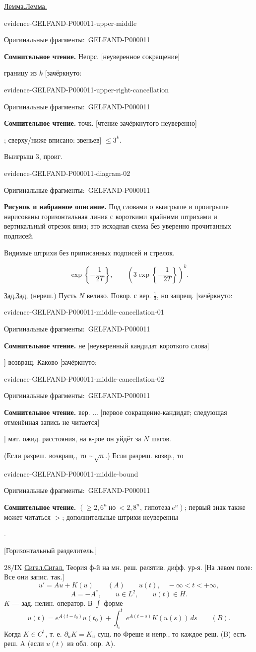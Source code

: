 \documentclass[11pt]{article}
\let\MathUnderline\underline
\renewcommand{\underline}[1]{\ifmmode\MathUnderline{#1}\else\uline{#1}\fi}
\newcommand{\EvidenceBlock}[4]{%
 \par\smallskip\noindent\begin{minipage}{\linewidth}
 \begin{minipage}[t]{.47\linewidth}\vspace{0pt}\centering
 \csname evidence-#1-#2\endcsname\par
 {\scriptsize\SourceCropCaption\ #1}\par
 \end{minipage}\hfill
 \begin{minipage}[t]{.49\linewidth}\vspace{0pt}\raggedright
 {\small\color{orange!65!black}\textbf{#4} #3}\par
 \end{minipage}
 \end{minipage}\par\smallskip}
\newcommand{\Unclear}[3]{\EvidenceBlock{#1}{#2}{#3}{\ReadingCaption}}
\newcommand{\SourceFigure}[3]{\EvidenceBlock{#1}{#2}{#3}{\DiagramCaption}}
\newcommand{\SourceCropCaption}{Оригинальные фрагменты:}\newcommand{\ReadingCaption}{Сомнительное чтение.}\newcommand{\IncompleteCaption}{Неразобранный фрагмент.}\newcommand{\DiagramCaption}{Рисунок и набранное описание.}
\begin{document}
\underline{Лемма.} \Unclear{GELFAND-P000011}{upper-middle}{Непрс. [неуверенное сокращение]} границу из $k$ [зачёркнуто: \Unclear{GELFAND-P000011}{upper-right-cancellation}{точк. [чтение зачёркнутого неуверенно]}; сверху/ниже вписано: звеньев] $\leq 3^k$.

Выигрыш $3$, проиг.
\SourceFigure{GELFAND-P000011}{diagram-02}{Под словами о выигрыше и проигрыше нарисованы горизонтальная линия с короткими крайними штрихами и вертикальный отрезок вниз; это исходная схема без уверенно прочитанных подписей.\par\smallskip\centering\resizebox{.93\linewidth}{!}{\begin{tikzpicture}[x=1cm,y=1cm,line width=.6pt]
\draw(-1.2,0)--(.5,0);\draw(.78,0)--(1.2,0);\draw(0,.12)--(0,-.9);
\end{tikzpicture}}\par{\footnotesize Видимые штрихи без приписанных подписей и стрелок.}}
\begin{equation*}
\exp\left\{-\frac{1}{2T}\right\},\qquad
\left(3\exp\left\{-\frac{1}{2T}\right\}\right)^k.
\end{equation*}

\underline{Зад.} (нереш.)
Пусть $N$ велико. Повор. с вер. $\frac13$, но запрещ. [зачёркнуто: \Unclear{GELFAND-P000011}{middle-cancellation-01}{не [неуверенный кандидат короткого слова]}] возвращ.
Каково [зачёркнуто: \Unclear{GELFAND-P000011}{middle-cancellation-02}{вер. ... [первое сокращение-кандидат; следующая отменённая запись не читается]}] мат. ожид. расстояния, на к-рое он уйдёт за $N$ шагов.

(Если разреш. возвращ., то $\sim\sqrt n$.)
Если разреш. возвр., то
\Unclear{GELFAND-P000011}{middle-bound}{$(\geq2{,}6^n\ \text{но}\ <2{,}8^n,\ \text{гипотеза}\ e^n)$; первый знак также может читаться $>$; дополнительные штрихи неуверенны}.

[Горизонтальный разделитель.]

$28/\mathrm{IX}$ \underline{Сигал.}
Теория ф-й на мн. реш. релятив. дифф. ур-я.
[На левом поле: Все они запис. так.]
\begin{equation*}
u'=Au+K(u)\qquad(A)\qquad u(t),\quad -\infty<t<+\infty,
\end{equation*}
\begin{equation*}
A=-A^*,\qquad u\in L^2,\qquad u(t)\in H.
\end{equation*}
$K$ --- зад. нелин. оператор.
В $\int$ форме
\begin{equation*}
u(t)=e^{A(t-t_0)}u(t_0)+\int_{t_0}^{t}e^{A(t-s)}K(u(s))\,ds\qquad(B).
\end{equation*}
Когда $K\in C^1$, т. е. $\partial_uK=K_u$ сущ. по Фреше и непр., то каждое реш. (B) есть реш. A (если $u(t)$ из обл. опр. A).
\end{document}
